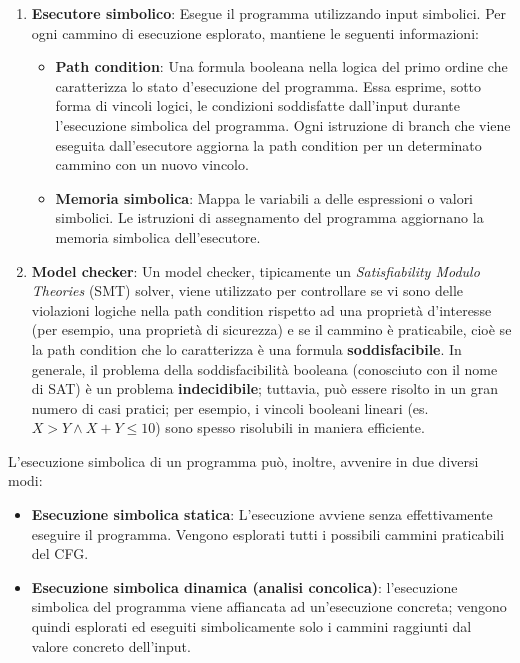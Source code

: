 \documentclass[../main.tex]{subfiles}
\begin{document}
\begin{enumerate}
    \item \textbf{Esecutore simbolico}: Esegue il programma utilizzando input simbolici. Per ogni cammino di esecuzione esplorato, mantiene le seguenti informazioni:
    \begin{itemize}
        \item \textbf{Path condition}: Una formula booleana nella logica del primo ordine che caratterizza lo stato d'esecuzione del programma. Essa esprime, sotto forma di vincoli logici, le condizioni soddisfatte dall'input durante l'esecuzione simbolica del programma.
        Ogni istruzione di branch che viene eseguita dall'esecutore aggiorna la path condition per un determinato cammino con un nuovo vincolo. 
        \item \textbf{Memoria simbolica}: Mappa le variabili a delle espressioni o valori simbolici. Le istruzioni di assegnamento del programma aggiornano la memoria simbolica dell'esecutore.
    \end{itemize}
    \item \textbf{Model checker}: Un model checker, tipicamente un \textit{Satisfiability Modulo Theories} (SMT) solver, viene utilizzato per controllare se vi sono delle violazioni logiche nella path condition rispetto ad una proprietà d'interesse (per esempio, una proprietà di sicurezza) e se il cammino è praticabile, cioè se la path condition che
    lo caratterizza è una formula \textbf{soddisfacibile}. In generale, il problema della soddisfacibilità booleana (conosciuto con il nome di SAT) è un problema \textbf{indecidibile}; tuttavia, può essere risolto in un gran numero di casi pratici; per esempio, 
    i vincoli booleani lineari (es. $X > Y \land X + Y \leq 10$) sono spesso risolubili in maniera efficiente.
\end{enumerate}
L'esecuzione simbolica di un programma può, inoltre, avvenire in due diversi modi:
\begin{itemize}
    \item \textbf{Esecuzione simbolica statica}: L'esecuzione avviene senza effettivamente eseguire il programma. Vengono esplorati tutti i possibili cammini praticabili del CFG.
    \item \textbf{Esecuzione simbolica dinamica (analisi concolica)}: l'esecuzione simbolica del programma viene affiancata ad un'esecuzione concreta; vengono quindi esplorati ed eseguiti simbolicamente solo i cammini raggiunti dal valore concreto dell'input.
\end{itemize}
\end{document}
